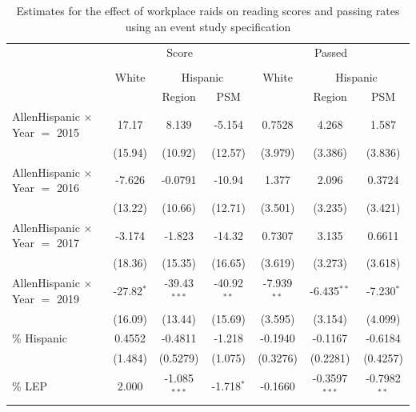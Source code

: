 \documentclass[hidelinks,twoside]{article}
\begin{document}
\begin{table}
\centering
\caption{Estimates for the effect of workplace raids on reading scores and passing rates using an event study specification}
\begin{tabular}{lcccccc}
   \tabularnewline \midrule \midrule
& \multicolumn{3}{c}{Score} & \multicolumn{3}{c}{Passed}\\
 \cline{2-7} \\
& White & \multicolumn{2}{c}{Hispanic} & White & \multicolumn{2}{c}{Hispanic} \\
    & & Region & PSM  & & Region & PSM \\ 
   \midrule
   AllenHispanic $\times$ Year $=$ 2015    & 17.17          & 8.139          & -5.154        & 0.7528        & 4.268           & 1.587\\   
                                            & (15.94)        & (10.92)        & (12.57)       & (3.979)       & (3.386)         & (3.836)\\   
   AllenHispanic $\times$ Year $=$ 2016    & -7.626         & -0.0791        & -10.94        & 1.377         & 2.096           & 0.3724\\   
                                            & (13.22)        & (10.66)        & (12.71)       & (3.501)       & (3.235)         & (3.421)\\   
   AllenHispanic $\times$ Year $=$ 2017    & -3.174         & -1.823         & -14.32        & 0.7307        & 3.135           & 0.6611\\   
                                            & (18.36)        & (15.35)        & (16.65)       & (3.619)       & (3.273)         & (3.618)\\   
   AllenHispanic $\times$ Year $=$ 2019     & -27.82$^{*}$   & -39.43$^{***}$ & -40.92$^{**}$ & -7.939$^{**}$ & -6.435$^{**}$   & -7.230$^{*}$\\   
                                            & (16.09)        & (13.44)        & (15.69)       & (3.595)       & (3.154)         & (4.099)\\   
   \% Hispanic                        & 0.4552         & -0.4811        & -1.218        & -0.1940       & -0.1167         & -0.6184\\   
                                            & (1.484)        & (0.5279)       & (1.075)       & (0.3276)      & (0.2281)        & (0.4257)\\   
   \% LEP                             & 2.000          & -1.085$^{***}$ & -1.718$^{*}$  & -0.1660       & -0.3597$^{***}$ & -0.7982$^{**}$\\   

\end{tabular}
\end{table}
\end{document}
